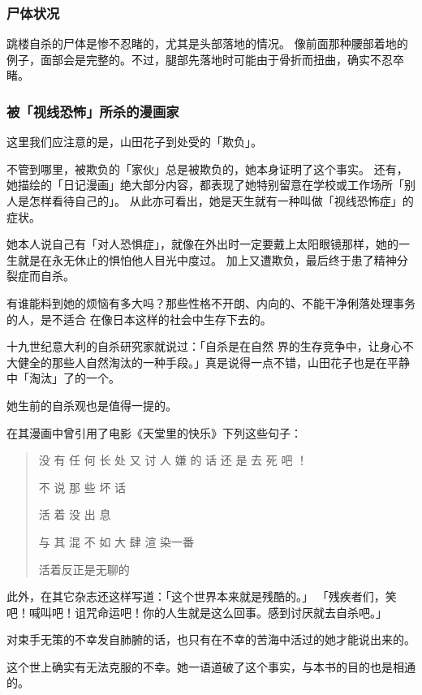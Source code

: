 \documentclass[UTF8]{ctexart}
\begin{document}
\subsubsection*{尸体状况}

跳楼自杀的尸体是惨不忍睹的，尤其是头部落地的情况。
像前面那种腰部着地的例子，面部会是完整的。不过，腿部先落地时可能由于骨折而扭曲，确实不忍卒睹。

\subsubsection*{被「视线恐怖」所杀的漫画家}

这里我们应注意的是，山田花子到处受的「欺负」。

不管到哪里，被欺负的「家伙」总是被欺负的，她本身证明了这个事实。
还有，她描绘的「日记漫画」绝大部分内容，都表现了她特别留意在学校或工作场所「别人是怎样看待自己的」。
从此亦可看出，她是天生就有一种叫做「视线恐怖症」的症状。

她本人说自己有「对人恐惧症」，就像在外出时一定要戴上太阳眼镜那样，她的一生就是在永无休止的惧怕他人目光中度过。
加上又遭欺负，最后终于患了精神分裂症而自杀。

有谁能料到她的烦恼有多大吗？那些性格不开朗、内向的、不能干净俐落处理事务的人，是不适合 在像日本这样的社会中生存下去的。

十九世纪意大利的自杀研究家就说过：「自杀是在自然 界的生存竞争中，让身心不大健全的那些人自然淘汰的一种手段。」真是说得一点不错，山田花子也是在平静中「淘汰」了的一个。 

她生前的自杀观也是值得一提的。

在其漫画中曾引用了电影《天堂里的快乐》下列这些句子：

\begin{verse}

没 有 任 何 长 处 又 讨 人 嫌 的 话 还 是 去 死 吧 ！

不 说 那 些 坏 话

活 着 没 出 息

与 其 混 不 如 大 肆 渲 染一番

活着反正是无聊的
\end{verse}

此外，在其它杂志还这样写道：「这个世界本来就是残酷的。」
「残疾者们，笑吧！喊叫吧！诅咒命运吧！你的人生就是这么回事。感到讨厌就去自杀吧。」

对束手无策的不幸发自肺腑的话，也只有在不幸的苦海中活过的她才能说出来的。

这个世上确实有无法克服的不幸。她一语道破了这个事实，与本书的目的也是相通的。
\end{document}
